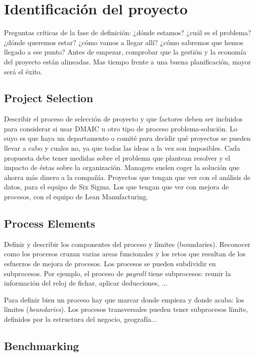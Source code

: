 \documentclass[oneside]{book}
\begin{document}
\chapter{Identificación del proyecto}
Preguntas críticas de la fase de definición: ¿dónde estamos? ¿cuál es el problema? ¿dónde queremos estar? ¿cómo vamos a llegar allí? ¿cómo sabremos que hemos llegado a ese punto? \newline Antes de empezar, comprobar que la gestión y la economía del proyecto están alineadas. Mas tiempo frente a una buena planificación, mayor será el éxito. 
\section{Project Selection}

Describir el proceso de selección de proyecto y que factores deben ser incluidos para considerar si usar DMAIC u otro tipo de proceso problema-solución. Lo suyo es que haya un departamento o comité para decidir qué proyectos se pueden llevar a cabo y cuales no, ya que todas las ideas a la vez son imposibles. Cada propuesta debe tener medidas sobre el problema que plantean resolver y el impacto de éstas sobre la organización. Managers suelen coger la solución que ahorra más dinero a la compañía. \newline
Proyectos que tengan que ver con el análisis de datos, para el equipo de Six Sigma. Los que tengan que ver con mejora de procesos, con el equipo de Lean Manufacturing.

\section{Process Elements}

Definir y describir los componentes del proceso	y límites (boundaries). Reconocer como los procesos cruzan varias areas funcionales y los retos que resultan de los esfuerzos de mejora de procesos. Los procesos se pueden subdividir en subprocesos.
Por ejemplo, el proceso de \textit{payroll} tiene subprocesos: reunir la información del reloj de fichar, aplicar deducciones, ...

Para definir bien un proceso hay que marcar donde empieza y donde acaba: los límites (\textit{boundaries}). Los procesos transversales pueden tener subprocesos límite, definidos por la estructura del negocio, geografía...

\section{Benchmarking}
\end{document}
